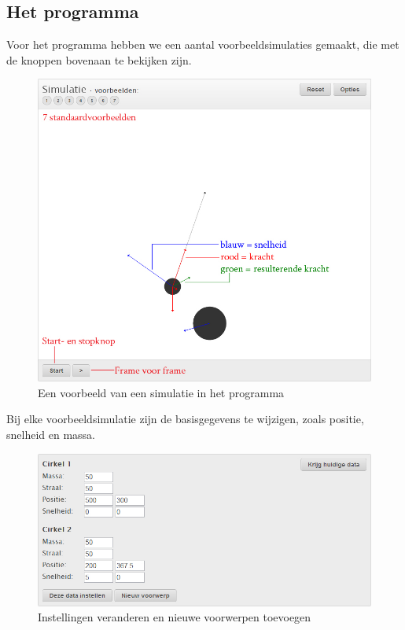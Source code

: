 \documentclass[12pt,a4paper]{article}
\begin{document}
	\subsection{Het programma}
	Voor het programma hebben we een aantal voorbeeldsimulaties gemaakt, die met de knoppen bovenaan te bekijken zijn.
	\begin{figure}[H]
		\centerline{\includegraphics[width=\textwidth]{Plaatjes/programma-uitleg.jpg}}
		\caption{Een voorbeeld van een simulatie in het programma}
	\end{figure}
	Bij elke voorbeeldsimulatie zijn de basisgegevens te wijzigen, zoals positie, snelheid en massa.
	\begin{figure}[H]
		\centerline{\includegraphics[width=\textwidth]{Plaatjes/programma-uitleg-instellen.jpg}}
		\caption{Instellingen veranderen en nieuwe voorwerpen toevoegen}
	\end{figure}
	
\end{document}
